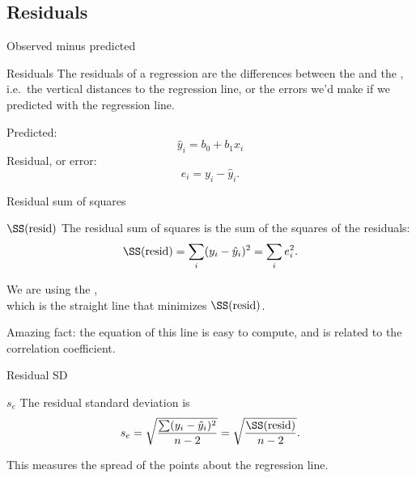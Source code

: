 \subsection{Residuals}


\begin{frame}{Observed minus predicted}

    \begin{block}{Residuals}
        The residuals of a regression are the differences between the  
        and the ,
        i.e.\ the vertical distances to the regression line,
        or the \alert{errors} we'd make if we predicted with the regression line.
    \end{block}

    \vspace{2em}

    Predicted:
    \[
        \hat y_i = b_0 + b_1 x_i
    \]
    Residual, or error:
    \[
        e_i = y_i - \hat y_i .
    \]

\end{frame}


\begin{frame}{Residual sum of squares}

    \begin{block}{$\SS(\text{resid})$}
        The \alert{residual sum of squares} is the sum of the squares of the residuals:
        \[
            \SS(\text{resid}) = \sum_i (y_i - \hat y_i)^2 = \sum_i e_i^2 .
        \]
    \end{block}

    \vspace{2em}

    We are using the ,\\
    which is the straight line that \alert{minimizes} $\SS(\text{resid})$.

    \vspace{2em}

    Amazing fact: the equation of this line is easy to compute,
    and is related to the correlation coefficient.


\end{frame}


\begin{frame}{Residual SD}

    \begin{block}{$s_e$}
        The \alert{residual standard deviation} is
        \[ s_e = \sqrt{ \frac{ \sum (y_i - \hat y_i)^2 }{n-2} } = \sqrt{ \frac{ \SS(\text{resid}) }{ n-2 } } .  \]
    \end{block}

    \vspace{2em}

    This measures the spread of the points about the regression line.


\end{frame}


